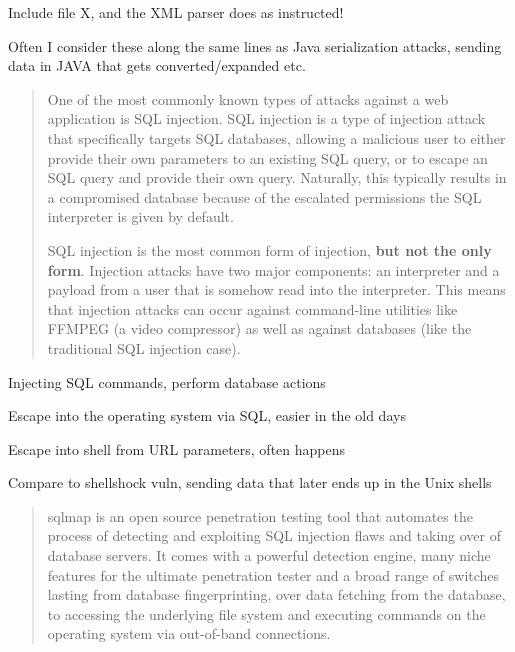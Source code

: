 \documentclass[Screen16to9,17pt]{foils}
\begin{document}
\begin{list2}
\item Include file X, and the XML parser does as instructed!
  \item Often I consider these along the same lines as Java serialization attacks, sending data in JAVA that gets converted/expanded etc.
\end{list2}


\begin{quote}
One of the most commonly known types of attacks against a web application is SQL injection. SQL injection is a type of injection attack that specifically targets SQL databases, allowing a malicious user to either provide their own parameters to an existing SQL query, or to escape an SQL query and provide their own query. Naturally, this typically results in a compromised database because of the escalated permissions the SQL interpreter is given by default.

SQL injection is the most common form of injection, {\bf but not the only form}. Injection attacks have two major components: an interpreter and a payload from a user that is somehow read into the interpreter. This means that injection attacks can occur against command-line utilities like FFMPEG (a video compressor) as well as against databases (like the traditional SQL injection case).
\end{quote}

\begin{list2}
\item Injecting SQL commands, perform database actions
\item Escape into the operating system via SQL, easier in the old days
\item Escape into shell from URL parameters, often happens
\item Compare to shellshock vuln, sending data that later ends up in the Unix shells
\end{list2}



\begin{quote}\small
sqlmap is an open source penetration testing tool that automates the process of detecting and exploiting SQL injection flaws and taking over of database servers. It comes with a powerful detection engine, many niche features for the ultimate penetration tester and a broad range of switches lasting from database fingerprinting, over data fetching from the database, to accessing the underlying file system and executing commands on the operating system via out-of-band connections.

\end{quote}
\end{document}
